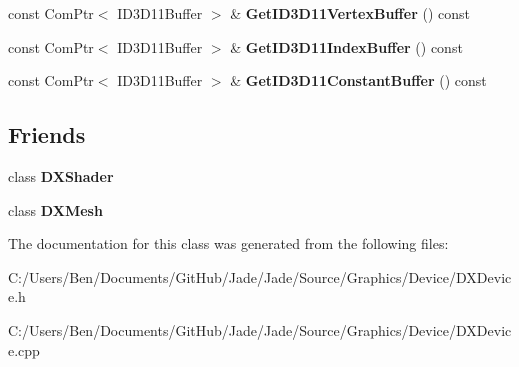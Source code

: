 \begin{DoxyCompactItemize}
\item 
\hypertarget{class_jade_1_1_graphics_1_1_d_x_device_a6b619a370709049ee74c42fc41f7a123}{}const Com\+Ptr$<$ I\+D3\+D11\+Buffer $>$ \& {\bfseries Get\+I\+D3\+D11\+Vertex\+Buffer} () const \label{class_jade_1_1_graphics_1_1_d_x_device_a6b619a370709049ee74c42fc41f7a123}

\item 
\hypertarget{class_jade_1_1_graphics_1_1_d_x_device_a01b1e438dbfa294b39620b4174c03db2}{}const Com\+Ptr$<$ I\+D3\+D11\+Buffer $>$ \& {\bfseries Get\+I\+D3\+D11\+Index\+Buffer} () const \label{class_jade_1_1_graphics_1_1_d_x_device_a01b1e438dbfa294b39620b4174c03db2}

\item 
\hypertarget{class_jade_1_1_graphics_1_1_d_x_device_a9d7df26b396703a81ebac6a6a38d6b3b}{}const Com\+Ptr$<$ I\+D3\+D11\+Buffer $>$ \& {\bfseries Get\+I\+D3\+D11\+Constant\+Buffer} () const \label{class_jade_1_1_graphics_1_1_d_x_device_a9d7df26b396703a81ebac6a6a38d6b3b}

\end{DoxyCompactItemize}
\subsection*{Friends}
\begin{DoxyCompactItemize}
\item 
\hypertarget{class_jade_1_1_graphics_1_1_d_x_device_afc213dbf8dcf10af02c807d991cab9f7}{}class {\bfseries D\+X\+Shader}\label{class_jade_1_1_graphics_1_1_d_x_device_afc213dbf8dcf10af02c807d991cab9f7}

\item 
\hypertarget{class_jade_1_1_graphics_1_1_d_x_device_a47fae447f05ec6db04250b6093adec40}{}class {\bfseries D\+X\+Mesh}\label{class_jade_1_1_graphics_1_1_d_x_device_a47fae447f05ec6db04250b6093adec40}

\end{DoxyCompactItemize}


The documentation for this class was generated from the following files\+:\begin{DoxyCompactItemize}
\item 
C\+:/\+Users/\+Ben/\+Documents/\+Git\+Hub/\+Jade/\+Jade/\+Source/\+Graphics/\+Device/D\+X\+Device.\+h\item 
C\+:/\+Users/\+Ben/\+Documents/\+Git\+Hub/\+Jade/\+Jade/\+Source/\+Graphics/\+Device/D\+X\+Device.\+cpp\end{DoxyCompactItemize}
